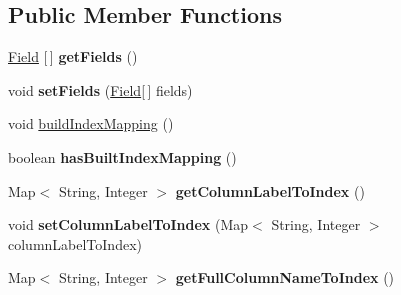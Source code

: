 \subsection*{Public Member Functions}
\begin{DoxyCompactItemize}
\item 
\mbox{\label{interfacecom_1_1mysql_1_1cj_1_1protocol_1_1_column_definition_ab5231022615e60179701e8e0b763c41a}} 
\mbox{\hyperlink{classcom_1_1mysql_1_1cj_1_1result_1_1_field}{Field}} \mbox{[}$\,$\mbox{]} {\bfseries get\+Fields} ()
\item 
\mbox{\label{interfacecom_1_1mysql_1_1cj_1_1protocol_1_1_column_definition_a795612d44026e85eedca7443f4f47381}} 
void {\bfseries set\+Fields} (\mbox{\hyperlink{classcom_1_1mysql_1_1cj_1_1result_1_1_field}{Field}}\mbox{[}$\,$\mbox{]} fields)
\item 
void \mbox{\hyperlink{interfacecom_1_1mysql_1_1cj_1_1protocol_1_1_column_definition_abadc6af9b7111fa0398649fe01a43308}{build\+Index\+Mapping}} ()
\item 
\mbox{\label{interfacecom_1_1mysql_1_1cj_1_1protocol_1_1_column_definition_a6eafbe53ee7659c0aa45a05b8a9f77e3}} 
boolean {\bfseries has\+Built\+Index\+Mapping} ()
\item 
\mbox{\label{interfacecom_1_1mysql_1_1cj_1_1protocol_1_1_column_definition_aa22f404b0faa1f9393ae5c34c2d943df}} 
Map$<$ String, Integer $>$ {\bfseries get\+Column\+Label\+To\+Index} ()
\item 
\mbox{\label{interfacecom_1_1mysql_1_1cj_1_1protocol_1_1_column_definition_aed78b554a078a7b133507dd62a891529}} 
void {\bfseries set\+Column\+Label\+To\+Index} (Map$<$ String, Integer $>$ column\+Label\+To\+Index)
\item 
\mbox{\label{interfacecom_1_1mysql_1_1cj_1_1protocol_1_1_column_definition_a68510237e7bbcb7778e1115b2c49f7ad}} 
Map$<$ String, Integer $>$ {\bfseries get\+Full\+Column\+Name\+To\+Index} ()

\end{DoxyCompactItemize}
